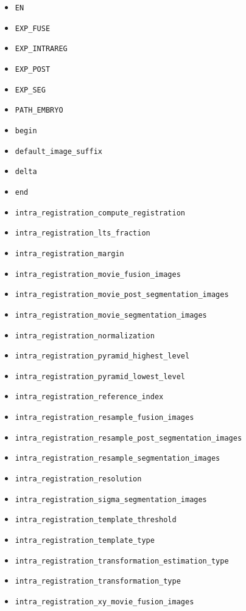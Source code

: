 \begin{itemize}
\itemsep -1ex
\item \texttt{EN}
\item \texttt{EXP\_FUSE}
\item \texttt{EXP\_INTRAREG}
\item \texttt{EXP\_POST}
\item \texttt{EXP\_SEG}
\item \texttt{PATH\_EMBRYO}
\item \texttt{begin}
\item \texttt{default\_image\_suffix}
\item \texttt{delta}
\item \texttt{end}
\item \texttt{intra\_registration\_compute\_registration}
\item \texttt{intra\_registration\_lts\_fraction}
\item \texttt{intra\_registration\_margin}
\item \texttt{intra\_registration\_movie\_fusion\_images}
\item \texttt{intra\_registration\_movie\_post\_segmentation\_images}
\item \texttt{intra\_registration\_movie\_segmentation\_images}
\item \texttt{intra\_registration\_normalization}
\item \texttt{intra\_registration\_pyramid\_highest\_level}
\item \texttt{intra\_registration\_pyramid\_lowest\_level}
\item \texttt{intra\_registration\_reference\_index}
\item \texttt{intra\_registration\_resample\_fusion\_images}
\item \texttt{intra\_registration\_resample\_post\_segmentation\_images}
\item \texttt{intra\_registration\_resample\_segmentation\_images}
\item \texttt{intra\_registration\_resolution}
\item \texttt{intra\_registration\_sigma\_segmentation\_images}
\item \texttt{intra\_registration\_template\_threshold}
\item \texttt{intra\_registration\_template\_type}
\item \texttt{intra\_registration\_transformation\_estimation\_type}
\item \texttt{intra\_registration\_transformation\_type}
\item \texttt{intra\_registration\_xy\_movie\_fusion\_images}

\end{itemize}

